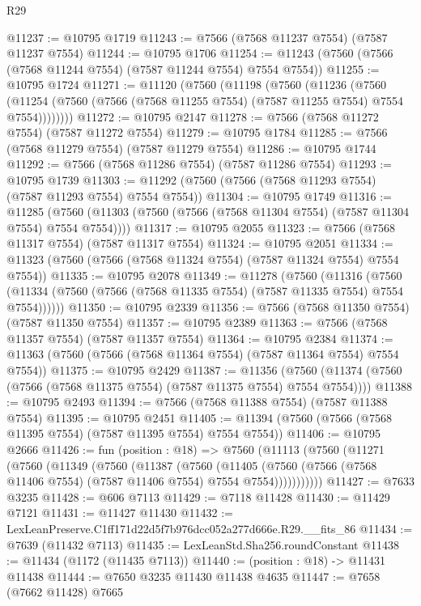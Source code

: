 \begin{lexlean}{R29}
\begin{coremodule}
@11237 := @10795 @1719
@11243 := @7566 (@7568 @11237 @7554) (@7587 @11237 @7554)
@11244 := @10795 @1706
@11254 := @11243 (@7560 (@7566 (@7568 @11244 @7554) (@7587 @11244 @7554) @7554 @7554))
@11255 := @10795 @1724
@11271 := @11120
    (@7560
      (@11198
        (@7560
          (@11236
            (@7560
              (@11254 (@7560 (@7566 (@7568 @11255 @7554) (@7587 @11255 @7554) @7554 @7554))))))))
@11272 := @10795 @2147
@11278 := @7566 (@7568 @11272 @7554) (@7587 @11272 @7554)
@11279 := @10795 @1784
@11285 := @7566 (@7568 @11279 @7554) (@7587 @11279 @7554)
@11286 := @10795 @1744
@11292 := @7566 (@7568 @11286 @7554) (@7587 @11286 @7554)
@11293 := @10795 @1739
@11303 := @11292 (@7560 (@7566 (@7568 @11293 @7554) (@7587 @11293 @7554) @7554 @7554))
@11304 := @10795 @1749
@11316 := @11285
    (@7560 (@11303 (@7560 (@7566 (@7568 @11304 @7554) (@7587 @11304 @7554) @7554 @7554))))
@11317 := @10795 @2055
@11323 := @7566 (@7568 @11317 @7554) (@7587 @11317 @7554)
@11324 := @10795 @2051
@11334 := @11323 (@7560 (@7566 (@7568 @11324 @7554) (@7587 @11324 @7554) @7554 @7554))
@11335 := @10795 @2078
@11349 := @11278
    (@7560
      (@11316
        (@7560 (@11334 (@7560 (@7566 (@7568 @11335 @7554) (@7587 @11335 @7554) @7554 @7554))))))
@11350 := @10795 @2339
@11356 := @7566 (@7568 @11350 @7554) (@7587 @11350 @7554)
@11357 := @10795 @2389
@11363 := @7566 (@7568 @11357 @7554) (@7587 @11357 @7554)
@11364 := @10795 @2384
@11374 := @11363 (@7560 (@7566 (@7568 @11364 @7554) (@7587 @11364 @7554) @7554 @7554))
@11375 := @10795 @2429
@11387 := @11356
    (@7560 (@11374 (@7560 (@7566 (@7568 @11375 @7554) (@7587 @11375 @7554) @7554 @7554))))
@11388 := @10795 @2493
@11394 := @7566 (@7568 @11388 @7554) (@7587 @11388 @7554)
@11395 := @10795 @2451
@11405 := @11394 (@7560 (@7566 (@7568 @11395 @7554) (@7587 @11395 @7554) @7554 @7554))
@11406 := @10795 @2666
@11426 := fun (position : @18) =>
  @7560
    (@11113
      (@7560
        (@11271
          (@7560
            (@11349
              (@7560
                (@11387
                  (@7560
                    (@11405
                      (@7560 (@7566 (@7568 @11406 @7554) (@7587 @11406 @7554) @7554 @7554)))))))))))
@11427 := @7633 @3235
@11428 := @606 @7113
@11429 := @7118 @11428
@11430 := @11429 @7121
@11431 := @11427 @11430
@11432 := LexLeanPreserve.C1ff171d22d5f7b976dcc052a277d666e.R29.__fits_86
@11434 := @7639 (@11432 @7113)
@11435 := LexLeanStd.Sha256.roundConstant
@11438 := @11434 (@1172 (@11435 @7113))
@11440 := (position : @18) -> @11431 @11438
@11444 := @7650 @3235 @11430 @11438 @4635
@11447 := @7658 (@7662 @11428) @7665

\end{coremodule}
\end{lexlean}
